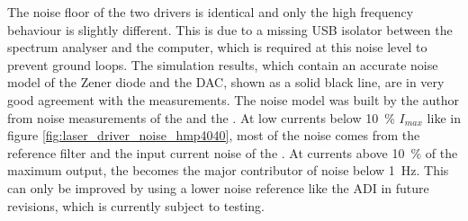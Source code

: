 The noise floor of the two drivers is identical and only the high frequency behaviour is slightly different. This is due to a missing USB isolator between the  spectrum analyser and the computer, which is required at this noise level to prevent ground loops. The simulation results, which contain an accurate noise model of the Zener diode and the DAC, shown as a solid black line, are in very good agreement with the measurements. The noise model was built by the author from noise measurements of the  and the . At low currents below \qty{10}{\percent} $I_{max}$ like in figure \ref{fig:laser_driver_noise_hmp4040}, most of the noise comes from the reference filter and the input current noise of the . At currents above \qty{10}{\percent} of the maximum output, the  becomes the major contributor of noise below \qty{1}{\Hz}. This can only be improved by using a lower noise reference like the ADI  in future revisions, which is currently subject to testing.

